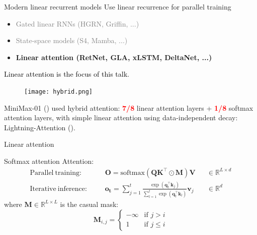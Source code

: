 \begin{frame}{Modern linear recurrent models}
    Use linear recurrence for parallel training
    \vspace{2mm}
    \begin{itemize}
        \item \textcolor{gray}{Gated linear RNNs (HGRN, Griffin, ...)}
        \item \textcolor{gray}{State-space models (S4, Mamba, ...)}
        \item \color{red}\textbf{Linear attention (RetNet, GLA, xLSTM, DeltaNet, ...)}
    \end{itemize}
    \vspace{2mm}
    \textcolor{black}{Linear attention is the focus of this talk.}
\end{frame}



\begin{frame}{}
    \begin{figure}
        \centering
        \texttt{[image: hybrid.png]}
    \end{figure}
    
    MiniMax-01 (\cite{minimax2025minimax01scalingfoundationmodels}) used hybrid attention: \textcolor{red}{\textbf{7/8}} linear attention layers + \textcolor{red}{\textbf{1/8}} softmax attention layers, with simple linear attention using data-independent decay: Lightning-Attention (\cite{Qin2024VariousLC}).
\end{frame}


\begin{frame}{}
    \centering
    \LARGE
     Linear attention  
\end{frame} 


\begin{frame}{Softmax attention}
     Attention:
    \[
    \begin{aligned}
        \mathrm{Parallel\ training:} &&& \mathbf{O} = \mathrm{softmax}(\mathbf{Q}\mathbf{K}^\top \odot \mathbf{M})\mathbf{V} &&\in \mathbb{R}^{L\times d}   \\
        \mathrm{Iterative\ inference:} &&&\mathbf{o_t} = \sum_{j=1}^t \frac{\exp(\mathbf{q}_t^\top \mathbf{k}_j)}{\sum_{l=1}^t\exp(\mathbf{q}^\top_t \mathbf{k}_l)}\mathbf{v}_j &&\in \mathbb{R}^d 
    \end{aligned}
    \]
    where $\mathbf{M} \in \mathbb{R}^{L \times L}$ is the casual mask:
    \[
    \mathbf{M}_{i,j} = \begin{cases}
        -\infty & \text{if } j > i \\
        1 & \text{if } j \leq i
    \end{cases}
    \]
\end{frame}

